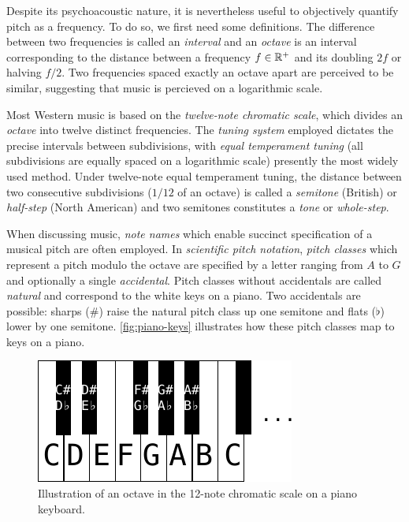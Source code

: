 \documentclass[dissertation.tex]{subfiles}
\begin{document}
Despite its psychoacoustic nature, it is nevertheless useful to objectively
quantify pitch as a frequency. To do so, we first need some definitions. The
difference between two frequencies is called an \emph{interval} and an
\emph{octave} is an interval corresponding to the distance between a frequency
$f \in \mathbb{R}^+$ and its doubling $2f$ or halving $f/2$. Two frequencies spaced
exactly an octave apart are perceived to be similar, suggesting that music is
percieved on a logarithmic scale.

Most Western music is based on the \emph{twelve-note chromatic scale}, which
divides an \emph{octave} into twelve distinct frequencies. The \emph{tuning
system} employed dictates the precise intervals between subdivisions, with
\emph{equal temperament tuning} (all subdivisions are equally spaced on a
logarithmic scale) presently the most widely used
method\cite{denton1997history}. 
Under twelve-note equal temperament tuning, the distance between two
consecutive subdivisions ($1/12$ of an octave) is called a \emph{semitone}
(British) or \emph{half-step} (North American) and two semitones constitutes
a \emph{tone} or \emph{whole-step}.

When discussing music, \emph{note names} which enable succinct specification of
a musical pitch are often employed. In \emph{scientific pitch notation},
\emph{pitch classes} which represent a pitch modulo the octave are specified by
a letter ranging from $A$ to $G$ and optionally a single \emph{accidental}. Pitch
classes without accidentals are called \emph{natural} and correspond to the white
keys on a piano. Two accidentals are possible: sharps ($\#$) raise the natural
pitch class up one semitone and flats ($\flat$) lower by one semitone.
\autoref{fig:piano-keys} illustrates how these pitch classes map to keys on a
piano.

\begin{figure}[htpb]
    \centering
    \includegraphics[width=0.6\linewidth]{Figures/piano-keys.pdf}
    \caption{Illustration of an octave in the 12-note chromatic scale
        on a piano keyboard.}
    \label{fig:piano-keys}
\end{figure}
\end{document}
